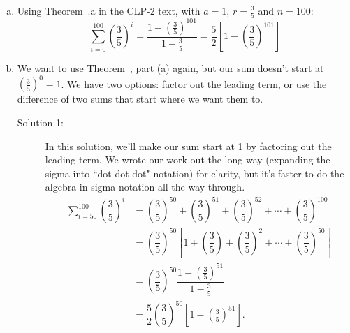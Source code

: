 \begin{solution}
\begin{enumerate}[(a)]
\item Using Theorem~.a in the CLP-2 text,
with $a=1$, $r=\frac{3}{5}$ and $n=100$:
\[\sum_{i=0}^{100} \left(\dfrac{3}{5}\right)^i = \dfrac{1-\left(\frac{3}{5}\right)^{101}}{1-\frac{3}{5}} = \dfrac{5}{2}\left[1-\left(\frac{3}{5}\right)^{101}\right]\]
\item We want to use Theorem~, part (a) again, but our sum doesn't start at $\left(\frac{3}{5}\right)^0=1$. We have two options: factor out the leading term, or use the difference of two sums that start where we want them to.
\begin{description}
\item[Solution 1:] In this solution, we'll make our sum start at 1 by factoring out the leading term. We wrote our work out the long way (expanding the sigma into ``dot-dot-dot" notation) for clarity, but it's faster to do the algebra in sigma notation all the way through.
\begin{align*}
\displaystyle\sum_{i=50}^{100} \left(\dfrac{3}{5}\right)^i&=
 \left(\dfrac{3}{5}\right)^{50}+ \left(\dfrac{3}{5}\right)^{51}+ \left(\dfrac{3}{5}\right)^{52}+\cdots+ \left(\dfrac{3}{5}\right)^{100}\\
 &=
 \left(\dfrac{3}{5}\right)^{50}\left[1+ \left(\dfrac{3}{5}\right)+ \left(\dfrac{3}{5}\right)^{2}+\cdots+ \left(\dfrac{3}{5}\right)^{50}\right]
\\
&= \left(\dfrac{3}{5}\right)^{50}\dfrac{1-\left(\frac{3}{5}\right)^{51}}{1-\frac{3}{5}}\\
&=\dfrac{5}{2}\left(\dfrac{3}{5}\right)^{50}\left[1-\left(\frac{3}{5}\right)^{51}\right].
\end{align*}


\end{description}
\end{enumerate}
\end{solution}
